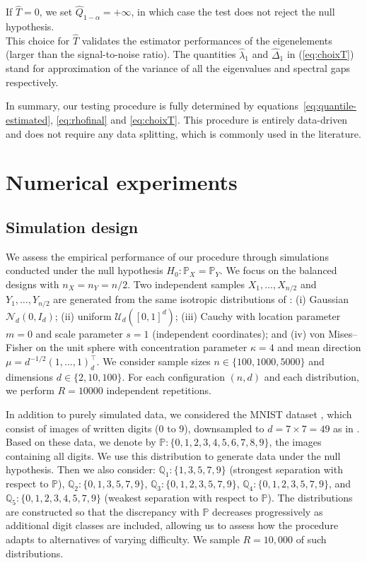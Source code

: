 \documentclass[twoside,11pt]{article}
\newcommand{\hatqmajfin}{\widehat{Q}}
\begin{document}
If $\widehat T = 0$, we set $\hatqmajfin_{1-\alpha}= +\infty$, in which case the test does not reject the null hypothesis. \\
This choice for $\widehat T$ validates the estimator performances of the eigenelements (larger than the signal-to-noise ratio). The quantities $\widehat{\lambda}_1$ and $\widehat{\Delta}_1$ in (\ref{eq:choixT}) stand for approximation of the variance of all the eigenvalues and spectral gaps respectively.

 In summary, our testing procedure is fully determined by equations~\eqref{eq:quantile-estimated}, \eqref{eq:rhofinal} and \eqref{eq:choixT}. This procedure is entirely data-driven and does not require any data splitting, which is commonly used in the literature.

\section{Numerical experiments}\label{sec:simu}
\subsection{Simulation design}\label{sec:simulation protocol}

We assess the empirical performance of our procedure through simulations conducted under the null hypothesis $H_0:\mathbb{P}_X=\mathbb{P}_Y$. We focus on the balanced designs with $n_X=n_Y=n/2$. Two independent samples $X_1,\dots,X_{n/2}$ and $Y_1,\dots,Y_{n/2}$  are generated from the same isotropic distributions of \citep{hagrass2023spectral}: (i) Gaussian $\mathcal{N}_d(0,I_d)$; (ii)  uniform $\mathcal{U}_d([0,1]^d)$; (iii) Cauchy with location parameter $m=0$ and scale parameter $s=1$ (independent coordinates); and (iv) von Mises--Fisher on the unit sphere with concentration parameter $\kappa=4$ and mean direction $\mu = d^{-1/2}(1,\ldots,1)_d^\top$. We consider sample sizes $n \in \{100,1000,5000\}$ and dimensions $d \in \{2,10,100\}$. For each configuration $(n,d)$ and each distribution, we perform $R=10000$ independent repetitions.  

In addition to purely simulated data, we considered the MNIST dataset \citep{lecun2010mnist}, which consist of images of written digits (0 to 9), downsampled to $d=7 \times 7 = 49$ as in \cite{schrab2023mmd,hagrass2023spectral}. Based on these data, we denote by $\mathbb{P}:\{0,1,2,3,4,5,6,7,8,9\}$, the images containing all digits. We use this distribution to generate data under the null hypothesis. Then we also consider: $\mathbb{Q}_1:\{1,3,5,7,9\}$ (strongest separation with respect to $\mathbb{P}$), $\mathbb{Q}_2:\{0,1,3,5,7,9\}$, $\mathbb{Q}_3:\{0,1,2,3,5,7,9\}$, $\mathbb{Q}_4:\{0,1,2,3,5,7,9\}$, and $\mathbb{Q}_5:\{0,1,2,3,4,5,7,9\}$ (weakest separation with respect to $\mathbb{P}$). The distributions are constructed so that the discrepancy with $\mathbb{P}$ decreases progressively as additional digit classes are included, allowing us to assess how the procedure adapts to alternatives of varying difficulty. We sample $R=10,000$ of such distributions.
\end{document}
